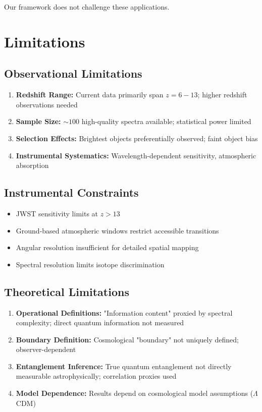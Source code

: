 \documentclass[twocolumn,aps,prd,superscriptaddress,nofootinbib]{revtex4-2}
\begin{document}
Our framework does not challenge these applications.

\section{Limitations}

\subsection{Observational Limitations}

\begin{enumerate}
    \item \textbf{Redshift Range:} Current data primarily span $z = 6-13$; higher redshift observations needed
    
    \item \textbf{Sample Size:} $\sim 100$ high-quality spectra available; statistical power limited
    
    \item \textbf{Selection Effects:} Brightest objects preferentially observed; faint object bias
    
    \item \textbf{Instrumental Systematics:} Wavelength-dependent sensitivity, atmospheric absorption
\end{enumerate}

\subsection{Instrumental Constraints}

\begin{itemize}
    \item JWST sensitivity limits at $z > 13$
    \item Ground-based atmospheric windows restrict accessible transitions
    \item Angular resolution insufficient for detailed spatial mapping
    \item Spectral resolution limits isotope discrimination
\end{itemize}

\subsection{Theoretical Limitations}

\begin{enumerate}
    \item \textbf{Operational Definitions:} "Information content" proxied by spectral complexity; direct quantum information not measured
    
    \item \textbf{Boundary Definition:} Cosmological "boundary" not uniquely defined; observer-dependent
    
    \item \textbf{Entanglement Inference:} True quantum entanglement not directly measurable astrophysically; correlation proxies used
    
    \item \textbf{Model Dependence:} Results depend on cosmological model assumptions ($\Lambda$CDM)
\end{enumerate}
\end{document}
